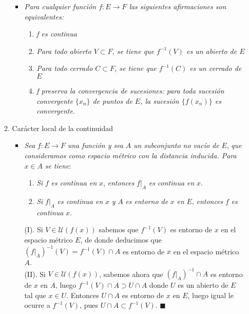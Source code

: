 \documentclass[a4paper, 12pt]{article}
\begin{document}
\begin{enumerate}[label=\textbf{\arabic*}.]
\begin{enumerate}[label=\textit{\alph*})]
\begin{itemize}
	\item \textit{Para cualquier función \(f:E \rightarrow F\) las siguientes afirmaciones son equivalentes:}
	\begin{enumerate}[label=(\textit{\roman*})]
		\item \textit{f es continua}
		\item \textit{Para todo abierto \(V \subset F\), se tiene que \(f^{-1}(V)\) es un abierto de \(E\)}
		\item \textit{Para todo cerrado \(C \subset F\), se tiene que \(f^{-1}(C)\) es un cerrado de \(E\)}
		\item \textit{f preserva la convergencia de sucesiones: para toda sucesión convergente \(\{x_n\}\) de puntos de \(E\), la sucesión \(\{f(x_n)\}\) es convergente}.
		\end{enumerate}
		\end{itemize}
\bigskip

	\item Carácter local de la continuidad
\begin{itemize}

	\item \textit{Sea} \(f: E \rightarrow F\) \textit{una función y sea} \(A\) \textit{un subconjunto no vacío de} \(E\), \textit{que consideramos como espacio métrico con la distancia inducida. Para} \(x \in A\) \textit{se tiene}:
	\begin{enumerate}[label=(\textit{\roman*})]
		\item \textit{Si} \(f\) \textit{es continua en} \(x\), \textit{entonces} \(\left. f \right|_A\) \textit{es continua en} \(x\).
		\item \textit{Si} \(\left. f \right|_A\) \textit{es continua en} \(x\) \textit{y} \(A\) \textit{es entorno de} \(x\) \textit{en} \(E\), \textit{entonces} \(f\) \textit{es continua} \(x\).
	\end{enumerate}
	
\vspace{0.5cm}

(I). Si \(V \in \mathcal{U}(f(x))\) sabemos que \(f^{-1}(V)\) es entorno de \(x\) en el espacio métrico \(E\), de donde deducimos que \((\left.f \right|_A)^{-1}(V) = f^{-1}(V) \cap A\) es entorno de \(x\) en el espacio métrico \(A\). \\

(II). Si \(V \in \mathcal{U}(f(x))\), sabemos ahora que \((\left. f \right|_A)^{-1} \cap A\) es entorno de \(x\) en \(A\), luego \(f^{-1}(V) \cap A \supset U \cap A\) donde \(U\) es un abierto de \(E\) tal que \(x \in U\). Entonces \(U \cap A\) es entorno de \(x\) en \(E\), luego igual le ocurre a \(f^{-1}(V)\), pues \(U \cap A \subset f^{-1}(V)\). \hspace{0.3cm} \(\blacksquare\)
\end{itemize}


\end{enumerate}
\end{enumerate}
\end{document}
